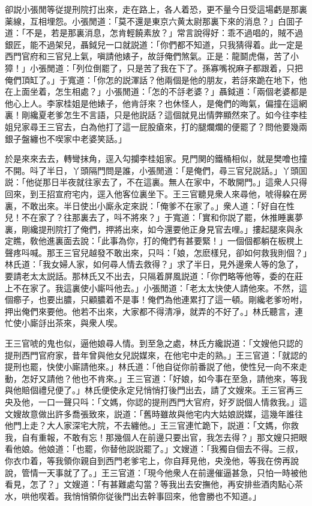 卻説小張閒等従提刑院打出來，走在路上，各人着恐，更不量今日受這場虧是那裏薬線，互相埋怨。小張閒道：「莫不還是東京六黄太尉那裏下來的消息？」白囬子道：「不是，若是那裏消息，怎肯輕饒素放？」常言說得好：乖不過唱的，賊不過銀匠，能不過架兒，聶鉞兒一口就説道：「你們都不知道，只我猜得着。此一定是西門官府和三官兒上氣，嗔請他婊子，故㧱俺們煞氣。正是：龍鬬虎傷，苦了小獐！」小張閒道：「列位倒罷了，只是苦了我在下了。孫寡嘴祝麻子都跟着，只把俺們頂缸了。」于寬道：「你怎的説渾話？他兩個是他的朋友，若㧱來跪在地下，他在上面坐着，怎生相處？」小張閒道：「怎的不㧱老婆？」聶鉞道：「兩個老婆都是他心上人。李家桂姐是他婊子，他肯㧱來？也休怪人，是俺們的晦氣，偏撞在這網裏！剛纔夏老爹怎生不言語，只是他説話？這個就見出情弊顯然來了。如今往李桂姐兒家尋王三官去，白為他打了這一屁股瘡來，打的腿爛爛的便罷了？問他要幾兩銀子盤纏也不喫家中老婆笑話。」

於是來來去去，轉彎抹角，逕入勾攔李桂姐家。見門関的鐵桶相似，就是樊噲也撞不開。呌了半日，丫頭隔門問是誰，小張閒道：「是俺們，尋三官兒説話。」丫頭囬説：「他従那日半夜就往家去了，不在這裏。無人在家中，不敢開門。」這衆人只得回來，到王招宣府宅内，逕入他客位裏坐下。王三官聽見衆人來尋他，唬得躱在房裏，不敢出來。半日使出小廝永定來説：「俺爹不在家了。」衆人道：「好自在性兒！不在家了？往那裏去了，呌不將來？」于寬道：「實和你説了罷，休推睡裏夢裏，剛纔提刑院打了俺們，押將出來，如今還要他正身見官去哩。」摟起腿來與永定瞧，敎他進裏面去說：「此事為你，打的俺們有甚要緊！」一個個都躺在板櫈上聲疼呌喊。那王三官兒越發不敢出來，只呌：「娘，怎麽樣兒，卻如何救我則個？」林氏道：「我女婦人家，如何尋人情去救得？」求了半日，見外邊衆人等的急了，要請老太太説話。那林氏又不出去，只隔着屏風説道：「你們略等他等，委的在莊上不在家了。我這裏使小廝呌他去。」小張閒道：「老太太快使人請他來。不然，這個癤子，也要出膿，只顧膿着不是事！俺們為他連累打了這一頓。剛纔老爹吩咐，押出俺們來要他。他若不出來，大家都不得清凈，就弄的不好了。」林氏聽言，連忙使小廝㧱出茶來，與衆人喫。

王三官唬的鬼也似，逼他娘尋人情。到至急之處，林氏方纔説道：「文嫂他只認的提刑西門官府家，昔年曾與他女兒説媒來，在他宅中走的熟。」王三官道：「就認的提刑也罷，快使小廝請他來。」林氏道：「他自従你前番説了他，使性兒一向不來走動，怎好又請他？他也不肯來。」王三官道：「好娘，如今事在至急，請他來，等我與他賠個禮兒便了。」林氏便使永定兒悄悄打後門出去，請了文嫂來。王三官再三央及他，一口一聲只呌：「文媽，你認的提刑西門大官府，好歹説個人情救我。」這文嫂故意做出許多喬張致來，説道：「舊時雖故與他宅内大姑娘説媒，這幾年誰往他門上走？大人家深宅大院，不去纏他。」王三官連忙跪下，説道：「文媽，你救我，自有重報，不敢有忘！那幾個人在前邊只要出官，我怎去得？」那文嫂只把眼看他娘。他娘道：「也罷，你替他説説罷了。」文嫂道：「我獨自個去不得。三叔，你衣巾着，等我領你親自到西門老爹宅上，你自拜見他，央浼他，等我在傍再說說，管情一天事就了了。」王三官道：「現今他衆人在前邊催逼甚急，只怕一時被他看見，怎了？」文嫂道：「有甚難處勾當？等我出去安撫他，再安排些酒肉點心茶水，哄他喫着。我悄悄領你従後門出去幹事回來，他會勝也不知道。」

